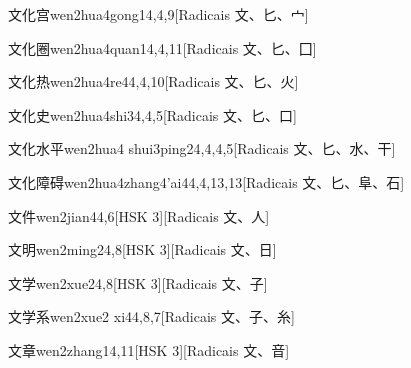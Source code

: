 \begin{entry}{文化宫}{wen2hua4gong1}{4,4,9}[Radicais ⽂、⼔、⼧]
\end{entry}

\begin{entry}{文化圈}{wen2hua4quan1}{4,4,11}[Radicais ⽂、⼔、⼞]
\end{entry}

\begin{entry}{文化热}{wen2hua4re4}{4,4,10}[Radicais ⽂、⼔、⽕]
\end{entry}

\begin{entry}{文化史}{wen2hua4shi3}{4,4,5}[Radicais ⽂、⼔、⼝]
\end{entry}

\begin{entry}{文化水平}{wen2hua4 shui3ping2}{4,4,4,5}[Radicais ⽂、⼔、⽔、⼲]
\end{entry}

\begin{entry}{文化障碍}{wen2hua4zhang4'ai4}{4,4,13,13}[Radicais ⽂、⼔、⾩、⽯]
\end{entry}

\begin{entry}{文件}{wen2jian4}{4,6}[HSK 3][Radicais ⽂、⼈]
\end{entry}

\begin{entry}{文明}{wen2ming2}{4,8}[HSK 3][Radicais ⽂、⽇]
\end{entry}

\begin{entry}{文学}{wen2xue2}{4,8}[HSK 3][Radicais ⽂、⼦]
\end{entry}

\begin{entry}{文学系}{wen2xue2 xi4}{4,8,7}[Radicais ⽂、⼦、⽷]
\end{entry}

\begin{entry}{文章}{wen2zhang1}{4,11}[HSK 3][Radicais ⽂、⾳]
\end{entry}

